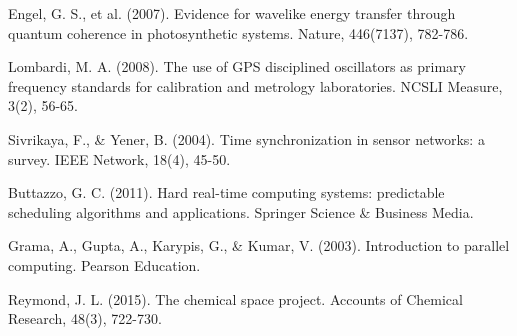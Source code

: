 \documentclass[12pt,a4paper]{article}
\begin{document}
\begin{thebibliography}{99}
Engel, G. S., et al. (2007). Evidence for wavelike energy transfer through quantum coherence in photosynthetic systems. Nature, 446(7137), 782-786.

Lombardi, M. A. (2008). The use of GPS disciplined oscillators as primary frequency standards for calibration and metrology laboratories. NCSLI Measure, 3(2), 56-65.

Sivrikaya, F., \& Yener, B. (2004). Time synchronization in sensor networks: a survey. IEEE Network, 18(4), 45-50.

Buttazzo, G. C. (2011). Hard real-time computing systems: predictable scheduling algorithms and applications. Springer Science \& Business Media.

Grama, A., Gupta, A., Karypis, G., \& Kumar, V. (2003). Introduction to parallel computing. Pearson Education.

Reymond, J. L. (2015). The chemical space project. Accounts of Chemical Research, 48(3), 722-730.

\end{thebibliography}
\end{document}
